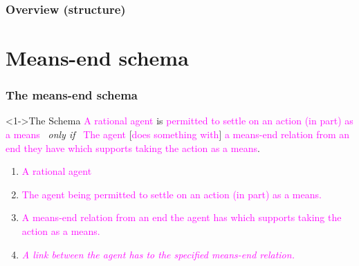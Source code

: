 \documentclass[noamssymb,
graphics,
]{beamer} %
\newcommand{\hozlinedash}[0]{
  \noindent\hdashrule[0.5ex][c]{\textwidth}{.1pt}{2.5pt}
}
\begin{document}
\begin{frame}


\end{frame}


\begin{frame}[noframenumbering]
  \frametitle{Overview (structure)}
  \tableofcontents[
  subsubsectionstyle=hide,
  ]
\end{frame}



\section{Means-end schema}
\label{sec:schema}

\begin{frame}
  \frametitle{The means-end schema}

  \begin{block}<1->{The Schema}
    \textcolor<3>{fuchsia}{A rational agent} is \textcolor<4>{fuchsia}{permitted to settle on an action (in part) as a means}
    \newline
    \mbox{ }\hfill\emph{only if}\hfill\mbox{ }
    \newline
    \textcolor<3>{fuchsia}{The agent} [\textcolor<6>{fuchsia}{does something with}] \textcolor<5>{fuchsia}{a means-end relation from an end they have which supports taking the action as a means}.
  \end{block}

  \begin{enumerate}
  \item<3-> \textcolor<3>{fuchsia}{A rational agent}
  \item<4-> \textcolor<4>{fuchsia}{The agent being permitted to settle on an action (in part) as a means.}
  \item<5-> \textcolor<5>{fuchsia}{A means-end relation from an end the agent has which supports taking the action as a means.}
  \item<6-> \textcolor<6->{fuchsia}{\emph<7>{A link between the agent has to the specified means-end relation.}}
  \end{enumerate}
\end{frame}
\end{document}
